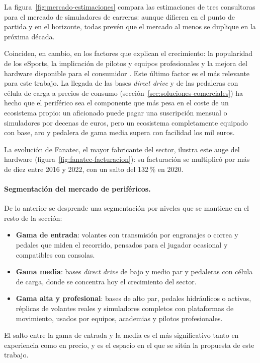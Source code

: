 La figura~\ref{fig:mercado-estimaciones} compara las estimaciones de tres consultoras para el mercado de simuladores de carreras: aunque difieren en el punto de partida y en el horizonte, todas prevén que el mercado al menos se duplique en la próxima década.



Coinciden, en cambio, en los factores que explican el crecimiento: la popularidad de los eSports, la implicación de pilotos y equipos profesionales y la mejora del hardware disponible para el consumidor \parencite{mordor_2025_racing_sim}. Este último factor es el más relevante para este trabajo. La llegada de las bases \textit{direct drive} y de las pedaleras con célula de carga a precios de consumo (sección~\ref{sec:soluciones-comerciales}) ha hecho que el periférico sea el componente que más pesa en el coste de un ecosistema propio: un aficionado puede pagar una suscripción mensual o simuladores por decenas de euros, pero un ecosistema completamente equipado con base, aro y pedalera de gama media supera con facilidad los mil euros.

La evolución de Fanatec, el mayor fabricante del sector, ilustra este auge del hardware (figura~\ref{fig:fanatec-facturacion}): su facturación se multiplicó por más de diez entre 2016 y 2022, con un salto del 132\,\% en 2020.



\paragraph{Segmentación del mercado de periféricos.}
De lo anterior se desprende una segmentación por niveles que se mantiene en el resto de la sección:
\begin{itemize}
	\item \textbf{Gama de entrada}: volantes con transmisión por engranajes o correa y pedales que miden el recorrido, pensados para el jugador ocasional y compatibles con consolas.
	\item \textbf{Gama media}: bases \textit{direct drive} de bajo y medio par y pedaleras con célula de carga, donde se concentra hoy el crecimiento del sector.
	\item \textbf{Gama alta y profesional}: bases de alto par, pedales hidráulicos o activos, réplicas de volantes reales y simuladores completos con plataformas de movimiento, usados por equipos, academias y pilotos profesionales.
\end{itemize}
El salto entre la gama de entrada y la media es el más significativo tanto en experiencia como en precio, y es el espacio en el que se sitúa la propuesta de este trabajo.

